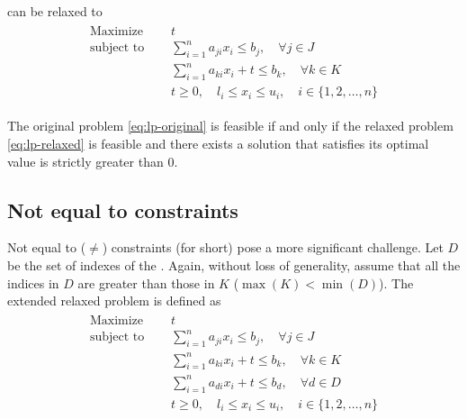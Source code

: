 \documentclass[runningheads]{llncs}
\begin{document}
can be relaxed to
\begin{align}
    \label{eq:lp-relaxed}
    \begin{split}
        \text{Maximize }   \quad & t                                                             \\
        \text{subject to } \quad & \sum_{i=1}^{n} a_{ji}x_{i} \le b_j, \quad \forall j \in J     \\
        \quad                    & \sum_{i=1}^{n} a_{ki}x_{i} + t \le b_k, \quad \forall k \in K \\
        & t \ge 0, \quad l_i \le x_i \le u_i,  \quad i \in \{1, 2, \ldots, n\}
    \end{split}
\end{align}

\begin{theorem}
    \label{thm:lp-relaxed}
    The original problem \eqref{eq:lp-original} is feasible if and only if the relaxed problem \eqref{eq:lp-relaxed} is feasible and there exists a solution that satisfies its optimal value is strictly greater than $0$.
\end{theorem}

\subsection{Not equal to constraints}

Not equal to ($\ne$) constraints (\nqcs for short) pose a more significant challenge.
Let $D$ be the set of indexes of the \nqcs.
Again, without loss of generality, assume that all the indices in $D$ are greater than those in $K$ ($\max(K) < \min(D)$).
The extended relaxed problem is defined as
\begin{align}
    \label{eq:lp-extended}
    \begin{split}
        \text{Maximize }   \quad & t                                                             \\
        \text{subject to } \quad & \sum_{i=1}^{n} a_{ji}x_{i} \le b_j, \quad \forall j \in J     \\
        \quad                    & \sum_{i=1}^{n} a_{ki}x_{i} + t \le b_k, \quad \forall k \in K \\
        \quad                    & \sum_{i=1}^{n} a_{di}x_{i} + t \le b_d, \quad \forall d \in D \\
        & t \ge 0, \quad l_i \le x_i \le u_i,  \quad i \in \{1, 2, \ldots, n\}
    \end{split}
\end{align}
\end{document}

